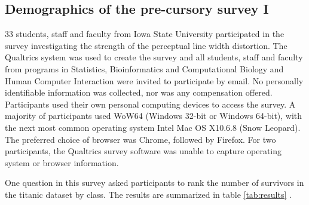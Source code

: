 
%

%
\appendix
\subsection*{Demographics of the pre-cursory survey I}\label{app1}
33 students, staff and faculty from Iowa State University participated in the survey investigating the strength of the perceptual line width distortion. The Qualtrics system \cite{} was used to create the survey and all students, staff and faculty from programs in Statistics, Bioinformatics and Computational Biology and Human Computer Interaction were invited to participate by email. No personally identifiable information was collected, nor was any compensation offered. Participants used their own personal computing devices to access the survey. A majority of participants used WoW64 (Windows 32-bit or Windows 64-bit), with the next most common operating system Intel Mac OS X10.6.8 (Snow Leopard). The preferred choice of browser was  Chrome, followed by Firefox. For two participants, the Qualtrics survey software was unable to capture operating system or browser information.

One question in this survey asked participants to rank the number of survivors in the titanic dataset by class. The results are summarized in table  \ref{tab:results} .


